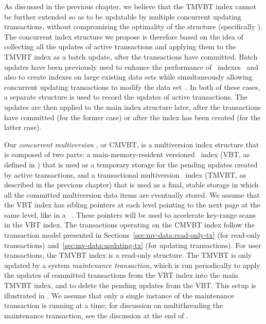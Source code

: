 As discussed in the previous chapter, we believe that the TMVBT index
cannot be further extended so as to be updatable by multiple concurrent
updating transactions, without compromising the optimality of the structure
(specifically ).
The concurrent index structure we propose is therefore based on the idea of
collecting all the updates of active transactions and applying them to the
TMVBT index as a batch update, after the transactions have committed.
Batch updates have been previously used to enhance the performance of \Btree\
indexes~\cite{pollari-malmi:1996:batch-updates,pollari-malmi:2000:differential-index}
and also to create indexes on large existing data sets while simultaneously
allowing concurrent updating transactions to modify the data
set~\cite{mohan:1992:side-file}.
In both of these cases, a separate structure is used to record the updates of
active transactions. 
The updates are then applied to the main index structure later, after the
transactions have committed (for the former case) or after the index has been
created (for the latter case).


Our \emph{concurrent multiversion \Btree}, or CMVBT, is a multiversion index
structure that is composed of two parts: a main-memory-resident versioned
\Btree\ index (VBT, as defined in \secref{sec:mv-index:btree}) that is used
as a temporary storage for the pending updates created by active
transactions, and a transactional multiversion \Btree\ index (TMVBT, as
described in the previous chapter) that is used as a final, stable storage in
which all the committed multiversion data items are eventually stored. 
We assume that the VBT index has sibling pointers at each level pointing to
the next page at the same level, like in a
\Blinktree~\cite{lehman:1981:b-link-tree}.
These pointers will be used to accelerate key-range scans in the VBT index. 
The transactions operating on the CMVBT index follow the transaction model
presented in Sections~\ref{sec:mv-data:read-only-tx} (for read-only
transactions) and~\ref{sec:mv-data:updating-tx} (for updating transactions).
For user transactions, the TMVBT index is a read-only structure. 
The TMVBT is only updated by a system \emph{maintenance transaction}, which
is run periodically to apply the updates of committed transactions from the
VBT index into the main TMVBT index, and to delete the pending updates from
the VBT\@.
This setup is illustrated in .
We assume that only a single instance of the maintenance transaction is running
at a time; for discussion on multithreading the maintenance transaction, see
the discussion at the end of \secref{sec:cmvbt:maintenance-tx}.

